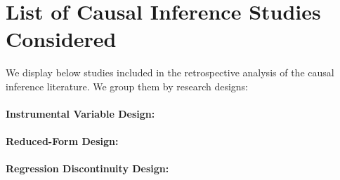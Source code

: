 \documentclass[12pt]{article}
\begin{document}



\pagebreak

\singlespacing
\setlength\bibsep{0pt}


\onehalfspacing

\pagebreak




\appendix

	\section{List of Causal Inference Studies Considered} \label{causal_lit}
	\setcounter{figure}{0}
	\renewcommand\thefigure{\thesection.\arabic{figure}}   
	
	We display below studies included in the retrospective analysis of the causal inference literature. We group them by research designs:

	\singlespacing
	\paragraph{Instrumental Variable Design:} \cite{moretti_pollution_2011, ebenstein_particulate_2015, schwartz_estimating_2015, arceo_does_2016, he_effect_2016,
	knittel_caution_2016, schlenker_airports_2016, sheldon_impact_2017, schwartz_estimating_2017, zhong_traffic_2017, barwick_morbidity_2018, hanlon2018london,
	schwartz_national_2018, halliday_vog_2019, deryugina_mortality_2019, cheung_mitigating_2020, fan_impact_2020, he_straw_2020, giaccherini_when_2021,
	godzinski_disentangling_2021, guidetti_placebo_2021, kim_air_2021, liu_effect_2021, xia_short-term_2022}
	
	\paragraph{Reduced-Form Design:} \cite{bauernschuster_when_2017, jans_economic_2018, jia_is_2019, godzinski2019short}
	
	\paragraph{Regression Discontinuity Design:} \cite{chen_air_2018, fan_winter_2020, anderson2022bounds}
	
\end{document}
